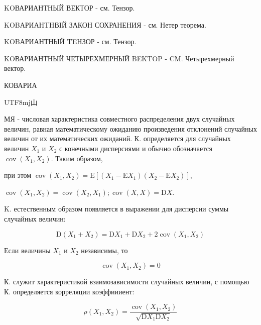 \documentclass[10pt]{article}
\begin{document}
KOВАРИАНТНЫЙ ВЕКТОР - см. Тензор.



KOBАРИАНTHВIЙ ЗАКОН СОХРАНЕНИЯ - см. Нетер теорема.



KOBАРИАНТНЫЙ TEHЗОР - см. Тензор.



KOВАРИАНТНЫЙ ЧЕТЫРЕХМЕРНЫЙ BEKTOP - $\mathrm{CM}$. Четырехмерный вектор.



КОВАРИА\begin{CJK}{UTF8}{mj}山\end{CJK}МЯ - числовая характеристика совместного распределения двух случайных величин, равная математическому ожиданию произведения отклонений случайных величин от их математических ожиданий. К. определяется для случайных величин $X_{1}$ и $X_{2}$ с конечными дисперсиями и обычно обозначается $\operatorname{cov}\left(X_{1}, X_{2}\right)$. Таким образом,



при этом $\operatorname{cov}\left(X_{1}, X_{2}\right)=\mathrm{E}\left[\left(X_{1}-\mathrm{E} X_{1}\right)\left(X_{2}-\mathrm{E} X_{2}\right)\right]$,



$\operatorname{cov}\left(X_{1}, X_{2}\right)=\operatorname{cov}\left(X_{2}, X_{1}\right) ; \operatorname{cov}(X, X)=\mathrm{D} X$.



K. естественным образом появляется в выражении для дисперсии суммы случайных величин:



\[

\mathrm{D}\left(X_{1}+X_{2}\right)=\mathrm{D} X_{1}+\mathrm{D} X_{2}+2 \operatorname{cov}\left(X_{1}, X_{2}\right)

\]



Если величины $X_{1}$ и $X_{2}$ независимы, то



\[

\operatorname{cov}\left(X_{1}, X_{2}\right)=0

\]



К. служит характеристикой взаимозависимости случайных величин, с помощью К. определяется корреляции коэффиииент:



\[

\rho\left(X_{1}, X_{2}\right)=\frac{\operatorname{cov}\left(X_{1}, X_{2}\right)}{\sqrt{\mathrm{D} X_{1} \mathrm{D} X_{2}}}

\]
\end{document}
